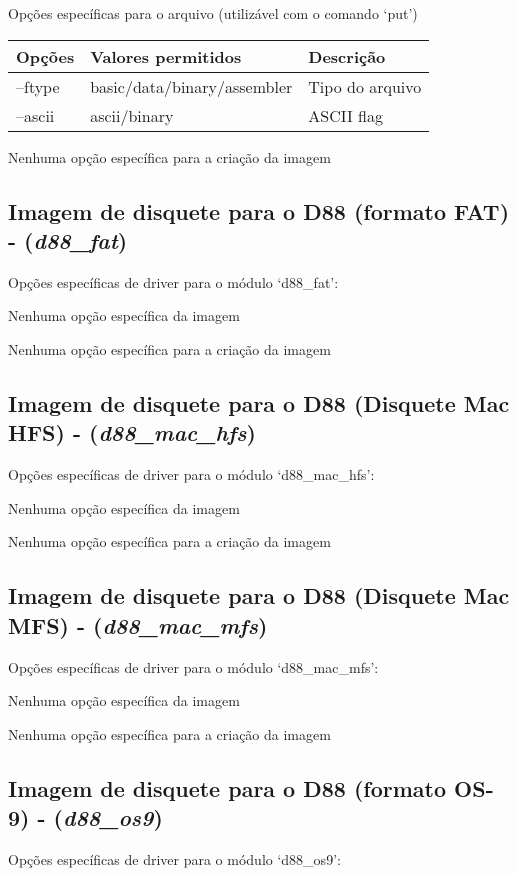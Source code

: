 \documentclass[letterpaper,10pt,brazil]{sphinxmanual}
\begin{document}
Opções específicas para o arquivo (utilizável com o comando `put')

\noindent\begin{tabulary}{\linewidth}{|L|L|L|}
\hline

Opções
&
Valores permitidos
&
Descrição
\\
\hline
--ftype
&
basic/data/binary/assembler
&
Tipo do arquivo
\\
\hline
--ascii
&
ascii/binary
&
ASCII flag
\\
\hline\end{tabulary}


Nenhuma opção específica para a criação da imagem


\subsection{Imagem de disquete para o D88 (formato FAT) - (\emph{d88\_fat})}
\label{tools/imgtool:imagem-de-disquete-para-o-d88-formato-fat-d88-fat}
Opções específicas de driver para o módulo `d88\_fat':

Nenhuma opção específica da imagem

Nenhuma opção específica para a criação da imagem


\subsection{Imagem de disquete para o D88 (Disquete Mac HFS) - (\emph{d88\_mac\_hfs})}
\label{tools/imgtool:imagem-de-disquete-para-o-d88-disquete-mac-hfs-d88-mac-hfs}
Opções específicas de driver para o módulo `d88\_mac\_hfs':

Nenhuma opção específica da imagem

Nenhuma opção específica para a criação da imagem


\subsection{Imagem de disquete para o D88 (Disquete Mac MFS) - (\emph{d88\_mac\_mfs})}
\label{tools/imgtool:imagem-de-disquete-para-o-d88-disquete-mac-mfs-d88-mac-mfs}
Opções específicas de driver para o módulo `d88\_mac\_mfs':

Nenhuma opção específica da imagem

Nenhuma opção específica para a criação da imagem


\subsection{Imagem de disquete para o D88 (formato OS-9) - (\emph{d88\_os9})}
\label{tools/imgtool:imagem-de-disquete-para-o-d88-formato-os-9-d88-os9}
Opções específicas de driver para o módulo `d88\_os9':
\end{document}
